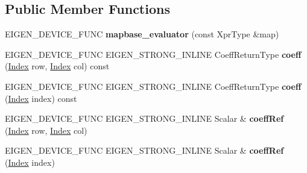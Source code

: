 \subsection*{Public Member Functions}
\begin{DoxyCompactItemize}
\item 
\mbox{\label{struct_eigen_1_1internal_1_1mapbase__evaluator_adeebd40502dff8fa523e7c17aa06abb2}} 
E\+I\+G\+E\+N\+\_\+\+D\+E\+V\+I\+C\+E\+\_\+\+F\+U\+NC {\bfseries mapbase\+\_\+evaluator} (const Xpr\+Type \&map)
\item 
\mbox{\label{struct_eigen_1_1internal_1_1mapbase__evaluator_a4dbe712d8bdb561e02b1420abdcc6cdc}} 
E\+I\+G\+E\+N\+\_\+\+D\+E\+V\+I\+C\+E\+\_\+\+F\+U\+NC E\+I\+G\+E\+N\+\_\+\+S\+T\+R\+O\+N\+G\+\_\+\+I\+N\+L\+I\+NE Coeff\+Return\+Type {\bfseries coeff} (\hyperlink{namespace_eigen_a62e77e0933482dafde8fe197d9a2cfde}{Index} row, \hyperlink{namespace_eigen_a62e77e0933482dafde8fe197d9a2cfde}{Index} col) const
\item 
\mbox{\label{struct_eigen_1_1internal_1_1mapbase__evaluator_a36d8eb7d3a2e378aa1bfde1d353f5382}} 
E\+I\+G\+E\+N\+\_\+\+D\+E\+V\+I\+C\+E\+\_\+\+F\+U\+NC E\+I\+G\+E\+N\+\_\+\+S\+T\+R\+O\+N\+G\+\_\+\+I\+N\+L\+I\+NE Coeff\+Return\+Type {\bfseries coeff} (\hyperlink{namespace_eigen_a62e77e0933482dafde8fe197d9a2cfde}{Index} index) const
\item 
\mbox{\label{struct_eigen_1_1internal_1_1mapbase__evaluator_ac9694e32bc42a9bf79e048ead295107b}} 
E\+I\+G\+E\+N\+\_\+\+D\+E\+V\+I\+C\+E\+\_\+\+F\+U\+NC E\+I\+G\+E\+N\+\_\+\+S\+T\+R\+O\+N\+G\+\_\+\+I\+N\+L\+I\+NE Scalar \& {\bfseries coeff\+Ref} (\hyperlink{namespace_eigen_a62e77e0933482dafde8fe197d9a2cfde}{Index} row, \hyperlink{namespace_eigen_a62e77e0933482dafde8fe197d9a2cfde}{Index} col)
\item 
\mbox{\label{struct_eigen_1_1internal_1_1mapbase__evaluator_a62d6d58da26d33a14ed1a755acecd97d}} 
E\+I\+G\+E\+N\+\_\+\+D\+E\+V\+I\+C\+E\+\_\+\+F\+U\+NC E\+I\+G\+E\+N\+\_\+\+S\+T\+R\+O\+N\+G\+\_\+\+I\+N\+L\+I\+NE Scalar \& {\bfseries coeff\+Ref} (\hyperlink{namespace_eigen_a62e77e0933482dafde8fe197d9a2cfde}{Index} index)

\end{DoxyCompactItemize}
